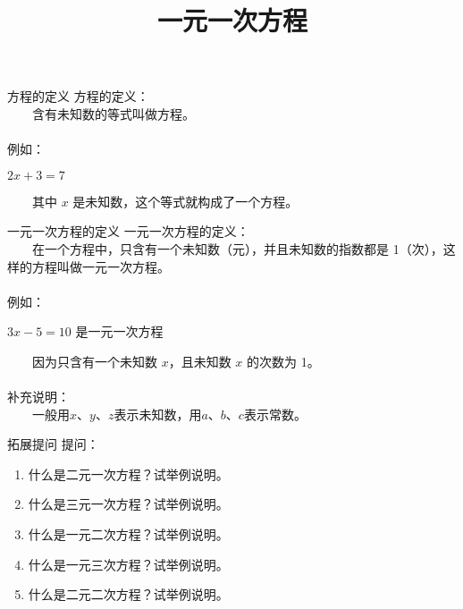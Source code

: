 \documentclass{ctexbeamer}
\title{一元一次方程}
\begin{document}
\begin{frame}
\titlepage
\end{frame}

\begin{frame}[t]{方程的定义}
方程的定义：\\
　　\alert{含有未知数的等式}叫做\alert{方程}。\\
\vspace{1em} \\
例如：\\
 \begin{center}
 \(2x + 3 = 7\) \\
 \end{center}
 　　其中 \(x\) 是未知数，这个等式就构成了一个方程。
\end{frame}

\begin{frame}[t]{一元一次方程的定义}
一元一次方程的定义：\\
　　在一个方程中，只含有一个\alert{未知数（元）}，并且\alert{未知数的指数都是 1（次）}，这样的方程叫做一元一次方程。\\
\\
例如：
\begin{center}
\(3x - 5 = 10\) 是一元一次方程
\end{center}
　　因为只含有\alert{一个未知数 \(x\)}，且\alert{未知数 \(x\) 的次数为 1}。\\
\\
补充说明：\\
　　一般用\alert{$x$、$y$、$z$}表示\alert{未知数}，用\alert{$a$、$b$、$c$}表示\alert{常数}。
\end{frame}

\begin{frame}[t]{拓展提问}
提问：\\
\begin{enumerate}[label={\arabic*.}]
\item 什么是二元一次方程？试举例说明。
\pause
\item 什么是三元一次方程？试举例说明。
\pause
\item 什么是一元二次方程？试举例说明。
\pause
\item 什么是一元三次方程？试举例说明。
\pause
\item 什么是二元二次方程？试举例说明。
\end{enumerate}
\end{frame}
\end{document}
